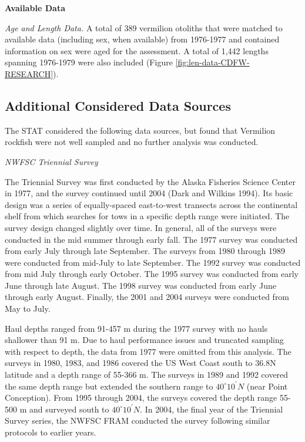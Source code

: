 \documentclass[11pt,
  english,
  a4paper,
]{article}
\begin{document}
\textbf{Available Data}

\emph{Age and Length Data.} A total of 389 vermilion otoliths that were matched to available data (including sex, when available) from 1976-1977 and contained information on sex were aged for the assessment. A total of 1,442 lengths spanning 1976-1979 were also included (Figure \ref{fig:len-data-CDFW-RESEARCH}).


\hypertarget{additional-considered-data-sources}{%
\subsection{Additional Considered Data Sources}\label{additional-considered-data-sources}}

\leavevmode\tagmcend\tagstructend

The STAT considered the following data sources, but found that Vermilion rockfish were not well sampled and no further analysis was conducted.

\emph{NWFSC Triennial Survey}

The Triennial Survey was first conducted by the Alaska Fisheries Science Center in 1977, and the survey continued until 2004 {(Dark and Wilkins 1994)\leavevmode\tagmcend\tagstructend}. Its basic design was a series of equally-spaced east-to-west transects across the continental shelf from which searches for tows in a specific depth range were initiated. The survey design changed slightly over time. In general, all of the surveys were conducted in the mid summer through early fall. The 1977 survey was conducted from early July through late September. The surveys from 1980 through 1989 were conducted from mid-July to late September. The 1992 survey was conducted from mid July through early October. The 1995 survey was conducted from early June through late August. The 1998 survey was conducted from early June through early August. Finally, the 2001 and 2004 surveys were conducted from May to July.

Haul depths ranged from 91-457 m during the 1977 survey with no hauls shallower than 91 m. Due to haul performance issues and truncated sampling with respect to depth, the data from 1977 were omitted from this analysis. The surveys in 1980, 1983, and 1986 covered the US West Coast south to 36.8\textdegree N latitude and a depth range of 55-366 m. The surveys in 1989 and 1992 covered the same depth range but extended the southern range to $40^\circ 10^\prime N$ (near Point Conception). From 1995 through 2004, the surveys covered the depth range 55-500 m and surveyed south to $40^\circ 10^\prime N$. In 2004, the final year of the Triennial Survey series, the NWFSC FRAM conducted the survey following similar protocols to earlier years.
\end{document}
